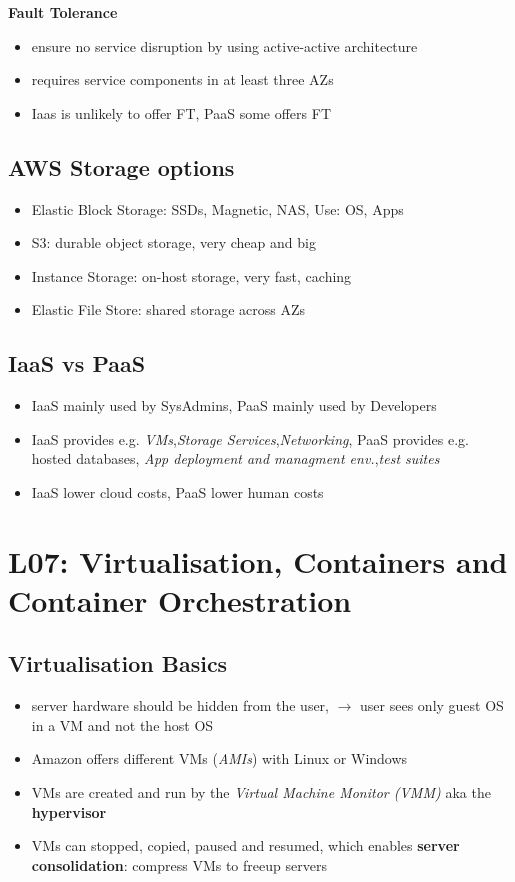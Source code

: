 \documentclass[a4paper]{article}
\begin{document}
\begin{multicols}{3}
\textbf{Fault Tolerance}
\begin{itemize}
    \item ensure no service disruption by using active-active architecture
    \item requires service components in at least three AZs
    \item Iaas is unlikely to offer FT, PaaS some offers FT
\end{itemize}

\subsection{AWS Storage options}
\begin{itemize}
    \item Elastic Block Storage: SSDs, Magnetic, NAS, Use: OS, Apps
    \item S3: durable object storage, very cheap and big
    \item Instance Storage: on-host storage, very fast, caching
    \item Elastic File Store: shared storage across AZs
\end{itemize}

\subsection{IaaS vs PaaS}
\begin{itemize}
    \item IaaS mainly used by SysAdmins, PaaS mainly used by Developers
    \item IaaS provides e.g. \textit{VMs},\textit{Storage Services},\textit{Networking}, PaaS provides e.g. hosted databases, \textit{App deployment and managment env.},\textit{test suites}
    \item IaaS lower cloud costs, PaaS lower human costs
\end{itemize}

\section{L07: Virtualisation, Containers and Container Orchestration}

\subsection{Virtualisation Basics}
\begin{itemize}
    \item server hardware should be hidden from the user, $\rightarrow$ user sees only guest OS in a VM and not the host OS
    \item Amazon offers different VMs (\textit{AMIs}) with Linux or Windows
    \item VMs are created and run by the \textit{Virtual Machine Monitor (VMM)} aka the \textbf{hypervisor}
    \item VMs can stopped, copied, paused and resumed, which enables \textbf{server consolidation}: compress VMs to freeup servers
\end{itemize}


\end{multicols}
\end{document}
